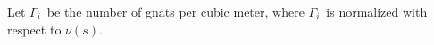 \documentclass{book}
\begin{document}
\newcommand{\CC}{$\Gamma_{i}$}
Let \CC\ be the number of gnats per cubic
meter, where \CC\ is normalized with
respect to $\nu(s)$.
\end{document}
